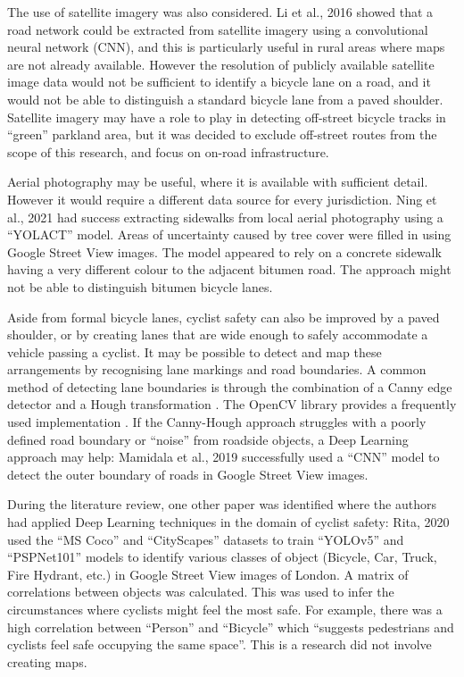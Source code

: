 \documentclass[11pt,twoside]{report}
\begin{document}
The use of satellite imagery was also considered.  Li et al., 2016 \cite{ROADNETWORK} showed that a road network could be extracted from satellite imagery using a convolutional neural network (CNN), and this is particularly useful in rural areas where maps are not already available.  However the resolution of publicly available satellite image data would not be sufficient to identify a bicycle lane on a road, and it would not be able to distinguish a standard bicycle lane from a paved shoulder.  Satellite imagery may have a role to play in detecting off-street bicycle tracks in ``green'' parkland area, but it was decided to exclude off-street routes from the scope of this research, and focus on on-road infrastructure.

Aerial photography may be useful, where it is available with sufficient detail.  However it would require a different data source for every jurisdiction.  Ning et al., 2021 \cite{NING2021} had success extracting sidewalks from local aerial photography using a ``YOLACT'' model.  Areas of uncertainty caused by tree cover were filled in using Google Street View images.  The model appeared to rely on a concrete sidewalk having a very different colour to the adjacent bitumen road.  The approach might not be able to distinguish bitumen bicycle lanes.

Aside from formal bicycle lanes, cyclist safety can also be improved by a paved shoulder, or by creating lanes that are wide enough to safely accommodate a vehicle passing a cyclist.  It may be possible to detect and map these arrangements by recognising lane markings and road boundaries.  A common method of detecting lane boundaries is through the combination of a Canny edge detector \cite{canny} and a Hough transformation \cite{hough}.  The OpenCV library provides a frequently used implementation \cite{opencv}.  If the Canny-Hough approach struggles with a poorly defined road boundary or ``noise'' from roadside objects, a Deep Learning approach may help:  Mamidala et al., 2019 \cite{8929655} successfully used a ``CNN'' model to detect the outer boundary of roads in Google Street View images.

During the literature review, one other paper was identified where the authors had applied Deep Learning techniques in the domain of cyclist safety:  Rita, 2020 \cite{rita_2020} used the ``MS Coco'' and ``CityScapes'' datasets to train ``YOLOv5'' and ``PSPNet101'' models to identify various classes of object (Bicycle, Car, Truck, Fire Hydrant, etc.) in Google Street View images of London.  A matrix of correlations between objects was calculated.  This was used to infer the circumstances where cyclists might feel the most safe.  For example, there was a high correlation between ``Person'' and ``Bicycle'' which ``suggests pedestrians and cyclists feel safe occupying the same space''.  This is a research did not involve creating maps.
\end{document}
